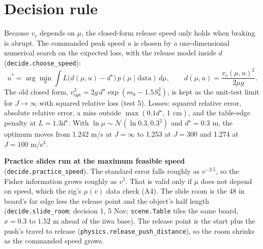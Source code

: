 \documentclass[10pt]{article}
\newcommand{\dstar}{d^{\star}}
\newcommand{\code}[1]{\texttt{#1}}
\begin{document}
\section{Decision rule}
\label{sec:decision}
Because $v_r$ depends on $\mu$, the closed-form release speed only holds when braking is abrupt.  The commanded peak
speed $u$ is chosen by a one-dimensional numerical search on the expected loss, with the release model inside $d$
(\code{decide.choose\_speed}):
\begin{equation}
u^{*}=\arg\min_{u}\int L\big(d(\mu,u)-\dstar\big)\,p(\mu\mid\text{data})\,d\mu,\qquad
d(\mu,u)=\frac{v_r(\mu,u)^{2}}{2\mu g}.
\end{equation}
The old closed form, $v_{\text{opt}}^{2}=2g\,\dstar\exp(m_k-1.5S_k^{2})$, is kept as the unit-test limit for
$J\to\infty$ with squared relative loss (test 5).  Losses: squared relative error, absolute relative error, a miss
outside $\max(0.1\dstar,\,1\text{ cm})$, and the table-edge penalty at $L=1.3\dstar$.  With $\ln\mu\sim\mathcal N(\ln0.3,0.3^2)$
and $\dstar=0.3$ m, the optimum moves from 1.242 m/s at $J=\infty$ to 1.253 at $J=300$ and 1.274 at $J=100$ m/s$^3$.

\textbf{Practice slides run at the maximum feasible speed} (\code{decide.practice\_speed}).  The standard error
falls roughly as $v^{-2.5}$, so the Fisher information grows roughly as $v^{5}$.  That is valid only if $\mu$ does not
depend on speed, which the rig's $\mu(v)$ data check (A4).  The slide room is the 48 in board's far edge less the release
point and the object's half length (\code{decide.slide\_room}; decision 1, 5 Nov; \code{scene.Table} tiles the same board,
$x = 0.3$ to $1.52$ m ahead of the iiwa base).  The release point is the start plus the push's travel to release
(\code{physics.release\_push\_distance}), so the room shrinks as the commanded speed grows.
\end{document}
